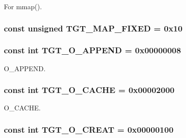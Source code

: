 For mmap(). \hypertarget{classMipsLinux_a0124e421d7846143bca15728b7a53e14}{
\subsubsection[{TGT\_\-MAP\_\-FIXED}]{\setlength{\rightskip}{0pt plus 5cm}const unsigned {\bf TGT\_\-MAP\_\-FIXED} = 0x10}}
\label{classMipsLinux_a0124e421d7846143bca15728b7a53e14}
\hypertarget{classMipsLinux_af11adc5404ea3780a5ce2829cc3710b7}{
\subsubsection[{TGT\_\-O\_\-APPEND}]{\setlength{\rightskip}{0pt plus 5cm}const int {\bf TGT\_\-O\_\-APPEND} = 0x00000008}}
\label{classMipsLinux_af11adc5404ea3780a5ce2829cc3710b7}


O\_\-APPEND. \hypertarget{classMipsLinux_ab30a547e309825ec5f9c5d11a6da543c}{
\subsubsection[{TGT\_\-O\_\-CACHE}]{\setlength{\rightskip}{0pt plus 5cm}const int {\bf TGT\_\-O\_\-CACHE} = 0x00002000}}
\label{classMipsLinux_ab30a547e309825ec5f9c5d11a6da543c}


O\_\-CACHE. \hypertarget{classMipsLinux_aec02e04ca367e6c3f4b46e4edc12efac}{
\subsubsection[{TGT\_\-O\_\-CREAT}]{\setlength{\rightskip}{0pt plus 5cm}const int {\bf TGT\_\-O\_\-CREAT} = 0x00000100}}
\label{classMipsLinux_aec02e04ca367e6c3f4b46e4edc12efac}


